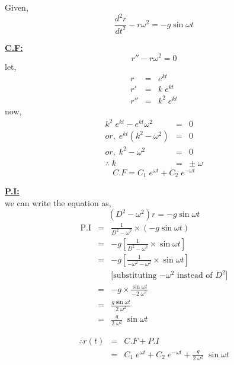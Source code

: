 \documentclass{article}
\begin{document}
\newpage
\subsection{}%
\large{
Given,
\begin{equation*}
    \frac{d^2 r}{dt^2}-r\omega^{2} = -g\sin{\omega t}
\end{equation*}

\vspace{1cm}

\begin{minipage}[t]{0.4\linewidth}
    \underline{\bfseries{C.F:}}
    $$r'' - r\omega^{2} = 0$$
    let,
    \begin{eqnarray*}
        r &=& e^{kt}\\
        r' &=& k\;e^{kt}\\
        r'' &=& k^2\;e^{kt}
    \end{eqnarray*}
    now,
    \begin{eqnarray*}
        k^2\;e^{kt} - e^{kt}\omega^2 &=& 0\\
        or,\;e^{kt} (k^2 - \omega^2) &=& 0\\
        or,\;k^2 - \omega^2 &=& 0\\
        \therefore\;k &=& \pm\;\omega
    \end{eqnarray*}
    $$C.F = C_1\;e^{\omega t} + C_2\;e^{-\omega t}$$
\end{minipage}\hfill
\begin{minipage}[t]{0.4\linewidth}
    \underline{\bfseries{P.I:}}\\
    we can write the equation as,
    $$(D^2 - \omega^2)r = -g\sin{\omega t}$$
    \begin{eqnarray*}
        \text{P.I} &=& \frac{1}{D^2 - \omega^2} \times (-g\sin{\omega t})\\
                   &=& -g\left[\frac{1}{D^2 - \omega^2}\times\sin{\omega t}\right]\\
                   &=& -g\left[\frac{1}{-\omega^2 -\omega^2}\times \sin{\omega t}\right]\\
                   &&\text{[substituting $-\omega^2$ instead of $D^2$]}\\
                   &=& -g\times\frac{\sin{\omega t}}{-2\;\omega^2}\\
                   &=& \frac{g\sin{\omega t}}{2\;\omega^2}\\
                   &=& \frac{g}{2\;\omega^2}\;\sin{\omega t}
    \end{eqnarray*}
\end{minipage}
\vspace{2cm}
\begin{eqnarray*}
    \therefore r(t) &=& C.F + P.I\\
                    &=& C_1\;e^{\omega t} + C_2\;e^{-\omega t} + \frac{g}{2\;\omega^2}\;\sin{\omega t}
\end{eqnarray*}
}
\newpage
\end{document}
